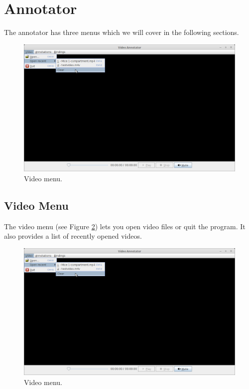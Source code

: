 \documentclass[a4paper]{book}
\begin{document}
\section{Annotator}

The annotator has three menus which we will cover in the following sections.

\begin{figure}[htb]
  \centering
  \includegraphics[width=12.0cm]{images/AnnotatorVideoMenu.png}
  \caption{Video menu.}
  \label{AnnotatorVideoMenu}
\end{figure}

\subsection{Video Menu}
The video menu (see Figure \ref{AnnotatorVideoMenu}) lets you open video
files or quit the program. It also provides a list of recently opened videos.

\begin{figure}[htb]
  \centering
  \includegraphics[width=12.0cm]{images/AnnotatorVideoMenu.png}
  \caption{Video menu.}
  \label{AnnotatorVideoMenu}
\end{figure}
\end{document}
